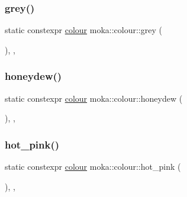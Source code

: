 \mbox{\label{classmoka_1_1colour_a362aa56326932673cafebb0253545a40}} 
\subsubsection{\texorpdfstring{grey()}{grey()}}
{\footnotesize\ttfamily static constexpr \mbox{\hyperlink{classmoka_1_1colour}{colour}} moka\+::colour\+::grey (\begin{DoxyParamCaption}{ }\end{DoxyParamCaption})\hspace{0.3cm}{\ttfamily [inline]}, {\ttfamily [static]}, {\ttfamily [noexcept]}}

\mbox{\label{classmoka_1_1colour_a0f335fdc74d79479b429174aa01233f8}} 
\subsubsection{\texorpdfstring{honeydew()}{honeydew()}}
{\footnotesize\ttfamily static constexpr \mbox{\hyperlink{classmoka_1_1colour}{colour}} moka\+::colour\+::honeydew (\begin{DoxyParamCaption}{ }\end{DoxyParamCaption})\hspace{0.3cm}{\ttfamily [inline]}, {\ttfamily [static]}, {\ttfamily [noexcept]}}

\mbox{\label{classmoka_1_1colour_a903c5603cd83d439a79d27aa7baec33b}} 
\subsubsection{\texorpdfstring{hot\_pink()}{hot\_pink()}}
{\footnotesize\ttfamily static constexpr \mbox{\hyperlink{classmoka_1_1colour}{colour}} moka\+::colour\+::hot\+\_\+pink (\begin{DoxyParamCaption}{ }\end{DoxyParamCaption})\hspace{0.3cm}{\ttfamily [inline]}, {\ttfamily [static]}, {\ttfamily [noexcept]}}

